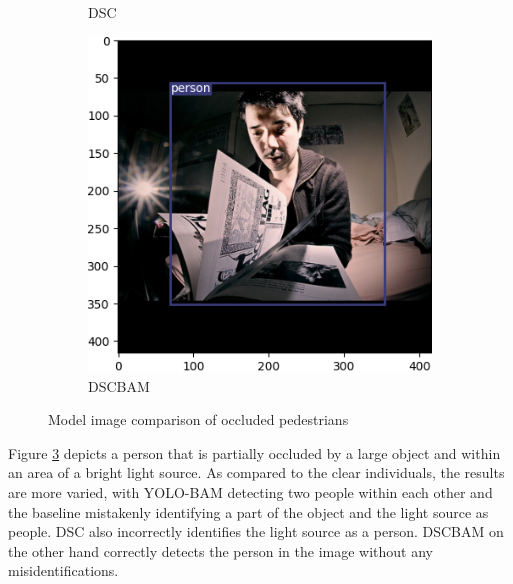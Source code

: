 \begin{figure}[!htbp]
\begin{subfigure}{.2\textwidth}
  \caption{DSC}
  \label{fig:dscnews}
\end{subfigure}%
\begin{subfigure}{.2\textwidth}
  \centering
  \includegraphics[width=\textwidth]{images/DSCBAM_newspaper.png}
  \caption{DSCBAM}
  \label{fig:dscbamnews}
\end{subfigure}
\caption{Model image comparison of occluded pedestrians}
\label{fig:news}
\end{figure}

Figure \ref{fig:news} depicts a person that is partially occluded by a large object and within an area of a bright light source. As compared to the clear individuals, the results are more varied, with YOLO-BAM detecting two people within each other and the baseline mistakenly identifying a part of the object and the light source as people. DSC also incorrectly identifies the light source as a person. DSCBAM on the other hand correctly detects the person in the image without any misidentifications.

